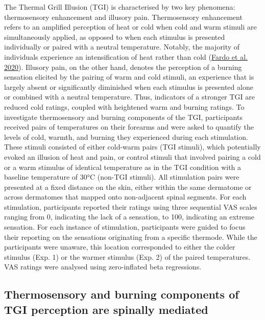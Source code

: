 \documentclass[
]{article}
\begin{document}
The Thermal Grill Illusion (TGI) is characterised by two key phenomena:
thermosensory enhancement and illusory pain. Thermosensory enhancement
refers to an amplified perception of heat or cold when cold and warm
stimuli are simultaneously applied, as opposed to when each stimulus is
presented individually or paired with a neutral temperature. Notably,
the majority of individuals experience an intensification of heat rather
than cold (\protect\hyperlink{ref-fardo_beyond_2020}{Fardo et al.
2020}). Illusory pain, on the other hand, denotes the perception of a
burning sensation elicited by the pairing of warm and cold stimuli, an
experience that is largely absent or significantly diminished when each
stimulus is presented alone or combined with a neutral temperature.
Thus, indicators of a stronger TGI are reduced cold ratings, coupled
with heightened warm and burning ratings. To investigate thermosensory
and burning components of the TGI, participants received pairs of
temperatures on their forearms and were asked to quantify the levels of
cold, warmth, and burning they experienced during each stimulation.
These stimuli consisted of either cold-warm pairs (TGI stimuli), which
potentially evoked an illusion of heat and pain, or control stimuli that
involved pairing a cold or a warm stimulus of identical temperature as
in the TGI condition with a baseline temperature of 30°C (non-TGI
stimuli). All stimulation pairs were presented at a fixed distance on
the skin, either within the same dermatome or across dermatomes that
mapped onto non-adjacent spinal segments. For each stimulation,
participants reported their ratings using three sequential VAS scales
ranging from 0, indicating the lack of a sensation, to 100, indicating
an extreme sensation. For each instance of stimulation, participants
were guided to focus their reporting on the sensations originating from
a specific thermode. While the participants were unaware, this location
corresponded to either the colder stimulus (Exp. 1) or the warmer
stimulus (Exp. 2) of the paired temperatures. VAS ratings were analysed
using zero-inflated beta regressions.

\hypertarget{thermosensory-and-burning-components-of-tgi-perception-are-spinally-mediated}{%
\subsection{Thermosensory and burning components of TGI perception are
spinally
mediated}\label{thermosensory-and-burning-components-of-tgi-perception-are-spinally-mediated}}
\end{document}
